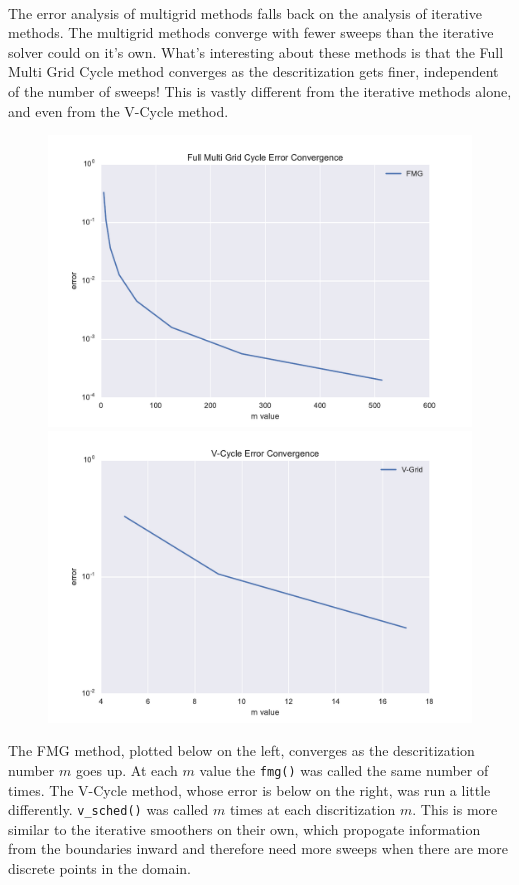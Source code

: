 \documentclass[pdftex,12pt,a4paper]{article}
\begin{document}
    \paragraph*{} The error analysis of multigrid methods falls back on the analysis of iterative methods. The multigrid methods converge with fewer sweeps than the iterative solver could on it's own. What's interesting about these methods is that the Full Multi Grid Cycle method converges as the descritization gets finer, independent of the number of sweeps! This is vastly different from the iterative methods alone, and even from the V-Cycle method. 
        \begin{figure}[h]
            \centering
            \includegraphics[scale=.4]{../plots/fmg_error.pdf}
            \includegraphics[scale=.4]{../plots/v_error.pdf}
        \end{figure}    
    The FMG method, plotted below on the left, converges as the descritization number $m$ goes up. At each $m$ value the \lstinline{fmg()} was called the same number of times. The V-Cycle method, whose error is below on the right, was run a little differently. \lstinline{v_sched()} was called $m$ times at each discritization $m$. This is more similar to the iterative smoothers on their own, which propogate information from the boundaries inward and therefore need more sweeps when there are more discrete points in the domain. 
\end{document}
